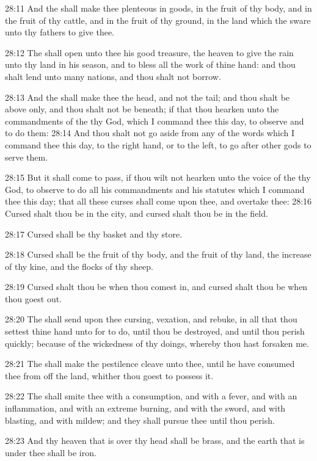28:11 And the \LORD shall make thee plenteous in goods, in the fruit of
thy body, and in the fruit of thy cattle, and in the fruit of thy
ground, in the land which the \LORD sware unto thy fathers to give
thee.

28:12 The \LORD shall open unto thee his good treasure, the heaven to
give the rain unto thy land in his season, and to bless all the work
of thine hand: and thou shalt lend unto many nations, and thou shalt
not borrow.

28:13 And the \LORD shall make thee the head, and not the tail; and
thou shalt be above only, and thou shalt not be beneath; if that thou
hearken unto the commandments of the \LORD thy God, which I command
thee this day, to observe and to do them: 28:14 And thou shalt not go
aside from any of the words which I command thee this day, to the
right hand, or to the left, to go after other gods to serve them.

28:15 But it shall come to pass, if thou wilt not hearken unto the
voice of the \LORD thy God, to observe to do all his commandments and
his statutes which I command thee this day; that all these curses
shall come upon thee, and overtake thee: 28:16 Cursed shalt thou be in
the city, and cursed shalt thou be in the field.

28:17 Cursed shall be thy basket and thy store.

28:18 Cursed shall be the fruit of thy body, and the fruit of thy
land, the increase of thy kine, and the flocks of thy sheep.

28:19 Cursed shalt thou be when thou comest in, and cursed shalt thou
be when thou goest out.

28:20 The \LORD shall send upon thee cursing, vexation, and rebuke, in
all that thou settest thine hand unto for to do, until thou be
destroyed, and until thou perish quickly; because of the wickedness of
thy doings, whereby thou hast forsaken me.

28:21 The \LORD shall make the pestilence cleave unto thee, until he
have consumed thee from off the land, whither thou goest to possess
it.

28:22 The \LORD shall smite thee with a consumption, and with a fever,
and with an inflammation, and with an extreme burning, and with the
sword, and with blasting, and with mildew; and they shall pursue thee
until thou perish.

28:23 And thy heaven that is over thy head shall be brass, and the
earth that is under thee shall be iron.

